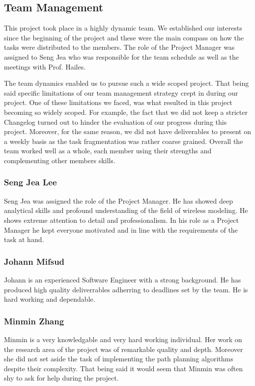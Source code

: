 \subsection{Team Management}
This project took place in a highly dynamic team. We established our interests
since the beginning of the project and these were the main compass on how the
tasks were distributed to the members. The role of the Project Manager was
assigned to Seng Jea who was responsible for the team schedule as well as the
meetings with Prof. Hailes.

The team dynamics enabled us to pursue such a wide scoped project. That being
said specific limitations of our team management strategy crept in during our
project. One of these limitations we faced, was what resulted in this project
becoming so widely scoped. For example, the fact that we did not keep a stricter
Changelog turned out to hinder the evaluation of our progress during this
project. Moreover, for the same reason, we did not have deliverables to present
on a weekly basis as the task fragmentation was rather coarse grained. Overall
the team worked well as a whole, each member using their strengths and
complementing other members skills.

\subsubsection{Seng Jea Lee}
Seng Jea was assigned the role of the Project Manager. He has showed deep
analytical skills and profound understanding of the field of wireless modeling.
He shows extreme attention to detail and professionalism. In his role as a
Project Manager he kept everyone motivated and in line with the requirements of
the task at hand.

\subsubsection{Johann Mifsud}
Johann is an experienced Software Engineer with a strong background. He
has produced high quality deliverrables adherring to deadlines set by the team.
He is hard working and dependable.

\subsubsection{Minmin Zhang}
Minmin is a very knowledgable and very hard working individual. Her work on the
research area of the project was of remarkable quality and depth. Moreover she
did not set aside the task of implementing the path planning algorithms despite
their complexity. That being said it would seem that Minmin was often shy to
ask for help during the project.

